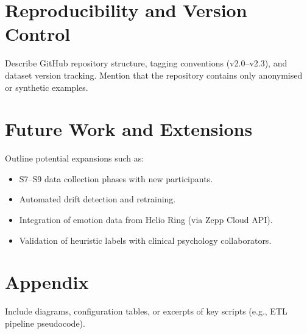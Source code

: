 \documentclass[12pt,a4paper]{article}
\begin{document}
\section{Reproducibility and Version Control}
Describe GitHub repository structure, tagging conventions (v2.0–v2.3), and dataset version tracking. Mention that the repository contains only anonymised or synthetic examples.

\section{Future Work and Extensions}
Outline potential expansions such as:\\
\begin{itemize}
    \item S7–S9 data collection phases with new participants.
    \item Automated drift detection and retraining.
    \item Integration of emotion data from Helio Ring (via Zepp Cloud API).
    \item Validation of heuristic labels with clinical psychology collaborators.
\end{itemize}

\appendix
\section{Appendix}
Include diagrams, configuration tables, or excerpts of key scripts (e.g., ETL pipeline pseudocode).
\end{document}
